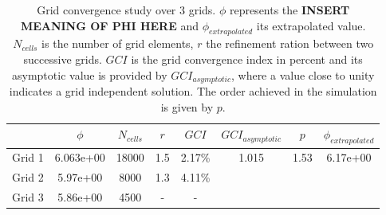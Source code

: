 
\begin{table}[tbp]
\caption{Grid convergence study over 3 grids. $ \phi $ represents the \textbf{INSERT MEANING OF PHI HERE} and $ \phi_{extrapolated} $ its extrapolated value. $ N_{cells} $ is the number of grid elements, $ r $ the refinement ration between two successive grids. $ GCI $ is the grid convergence index in percent and its asymptotic value is provided by $ GCI_{asymptotic} $, where a value close to unity indicates a grid independent solution. The order achieved in the simulation is given by $ p $.}
\label{tab:gci_study}
\begin{tabular}{@{}lccccccc@{}}
\toprule
& $ \phi $ & $ N_{cells} $ & $ r $ & $ GCI $ & $ GCI_{asymptotic} $ & $ p $ & $ \phi_{extrapolated} $ \\ \midrule
Grid 1 & 6.063e+00 & 18000 & 1.5 & 2.17\%   & \multirow{3}{*}{ 1.015 } & \multirow{3}{*}{ 1.53 } & \multirow{3}{*}{ 6.17e+00 } \\ 
Grid 2 & 5.97e+00 & 8000  & 1.3 & 4.11\% &                       &                      &                       \\ 
Grid 3 & 5.86e+00 & 4500  & -   & -     &                       &                      &                       \\ \bottomrule 
\end{tabular}
\end{table}
